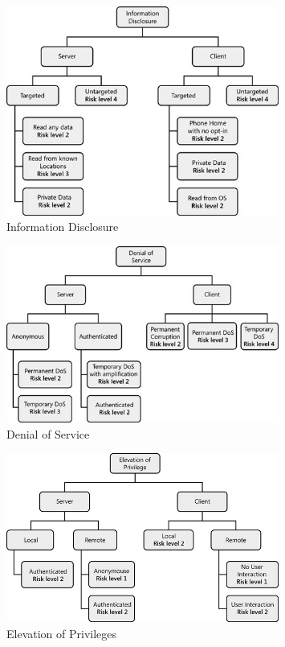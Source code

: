 \documentclass[../main.tex]{subfiles}
\begin{document}
\begin{figure}[h!]
    \centering
    \includegraphics[width=0.8\textwidth]{../images/information.png}
    \caption{Information Disclosure}
    \label{information}
\end{figure}
    
\begin{figure}[h!]
    \centering
    \includegraphics[width=0.8\textwidth]{../images/dos.png}
    \caption{Denial of Service}
    \label{dos}
\end{figure}
    
\begin{figure}[h!]
    \centering
    \includegraphics[width=0.8\textwidth]{../images/eop.png}
    \caption{Elevation of Privileges}
    \label{eop}
\end{figure}
\end{document}
